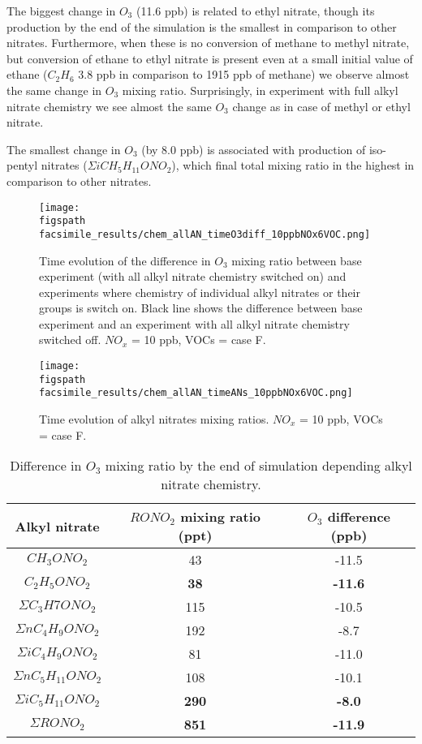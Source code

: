 \documentclass[11pt,a4paper]{article}
\newcommand{\figspath}{figures/}
\begin{document}
The biggest change in $O_3$ (11.6 ppb) is related to ethyl nitrate, though its production by the end of the simulation is the smallest in comparison to other nitrates. Furthermore, when these is no conversion of methane to methyl nitrate, but conversion of ethane to ethyl nitrate is present even at a small initial value of ethane ($C_2H_6$ 3.8 ppb in comparison to 1915 ppb of methane) we observe almost the same change in $O_3$ mixing ratio. Surprisingly, in experiment with full alkyl nitrate chemistry we see almost the same $O_3$ change as in case of methyl or ethyl nitrate.

The smallest change in $O_3$ (by 8.0 ppb) is associated with production of iso-pentyl nitrates ($\Sigma iCH_5H_{11}ONO_2$), which final total mixing ratio in the highest in comparison to other nitrates.

\begin{figure}
\centering
\texttt{[image: \\figspath facsimile\_results/chem\_allAN\_timeO3diff\_10ppbNOx6VOC.png]}
\caption{Time evolution of the difference in $O_3$ mixing ratio between base experiment (with all alkyl nitrate chemistry switched on) and experiments where chemistry of individual alkyl nitrates or their groups is switch on. Black line shows the difference between base experiment and an experiment with all alkyl nitrate chemistry switched off. $NO_x$ = 10 ppb, VOCs = case F.}
\label{fig:timeO3diff10ppbNOx6VOC}
\end{figure}

\begin{figure}
\centering
\texttt{[image: \\figspath facsimile\_results/chem\_allAN\_timeANs\_10ppbNOx6VOC.png]}
\caption{Time evolution of alkyl nitrates mixing ratios. $NO_x$ = 10 ppb, VOCs = case F.}
\label{fig:timeANs10ppbNOx6VOC}
\end{figure}

\begin{table}
\caption{Difference in $O_3$ mixing ratio by the end of simulation depending alkyl nitrate chemistry.}
\label{tab:timeO3diffANs10ppbNOx6VOC}
\centering
\begin{tabular}{ccc}
\hline
Alkyl nitrate            & $RONO_2$ mixing ratio (ppt) & $O_3$ difference (ppb) \\
\hline
$CH_3ONO_2$              & 43  & -11.5 \\
$C_2H_5ONO_2$            & \textbf{38}  & \textbf{-11.6} \\
$\Sigma C_3H7ONO_2$      & 115 & -10.5 \\
$\Sigma nC_4H_9ONO_2$    & 192 & -8.7  \\
$\Sigma iC_4H_9ONO_2$    & 81  & -11.0 \\
$\Sigma nC_5H_{11}ONO_2$ & 108 & -10.1 \\
$\Sigma iC_5H_{11}ONO_2$ & \textbf{290} & \textbf{-8.0}  \\
\textbf{$\Sigma RONO_2$} & \textbf{851} & \textbf{-11.9} \\
\hline
\end{tabular}
\end{table}
\end{document}
